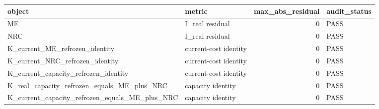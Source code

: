 
\begin{tabular}{llrl}
\toprule
object & metric & max\_abs\_residual & audit\_status\\
\midrule
ME & I\_real residual & 0 & PASS\\
NRC & I\_real residual & 0 & PASS\\
K\_current\_ME\_refrozen\_identity & current-cost identity & 0 & PASS\\
K\_current\_NRC\_refrozen\_identity & current-cost identity & 0 & PASS\\
K\_current\_capacity\_refrozen\_identity & current-cost identity & 0 & PASS\\
\addlinespace
K\_real\_capacity\_refrozen\_equals\_ME\_plus\_NRC & capacity identity & 0 & PASS\\
K\_current\_capacity\_refrozen\_equals\_ME\_plus\_NRC & capacity identity & 0 & PASS\\
\bottomrule
\end{tabular}
